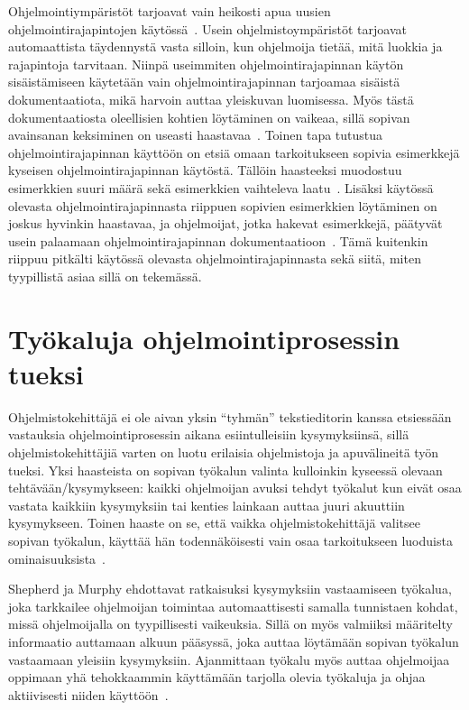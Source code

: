 \documentclass[finnish]{tktltiki2}
\theoremstyle{definition}
\theoremstyle{remark}
\begin{document}
Ohjelmointiympäristöt tarjoavat vain heikosti apua uusien ohjelmointirajapintojen käytössä~\cite{jungloid-mining}. Usein ohjelmistoympäristöt tarjoavat automaattista täydennystä vasta silloin, kun ohjelmoija tietää, mitä luokkia ja rajapintoja tarvitaan. Niinpä useimmiten ohjelmointirajapinnan käytön sisäistämiseen käytetään vain ohjelmointirajapinnan tarjoamaa sisäistä dokumentaatiota, mikä harvoin auttaa yleiskuvan luomisessa. Myös tästä dokumentaatiosta oleellisien kohtien löytäminen on vaikeaa, sillä sopivan avainsanan keksiminen on useasti haastavaa~\cite{what-to-search-for}.
Toinen tapa tutustua ohjelmointirajapinnan käyttöön on etsiä omaan tarkoitukseen sopivia esimerkkejä kyseisen ohjelmointirajapinnan käytöstä. Tällöin haasteeksi muodostuu esimerkkien suuri määrä sekä esimerkkien vaihteleva laatu~\cite{example-overflow-social-media-for-code-recommendations}. Lisäksi käytössä olevasta ohjelmointirajapinnasta riippuen sopivien esimerkkien löytäminen on joskus hyvinkin haastavaa, ja ohjelmoijat, jotka hakevat esimerkkejä, päätyvät usein palaamaan ohjelmointirajapinnan dokumentaatioon~\cite{asking-and-answering-api-questions}. Tämä kuitenkin riippuu pitkälti käytössä olevasta ohjelmointirajapinnasta sekä siitä, miten tyypillistä asiaa sillä on tekemässä.

\section{Työkaluja ohjelmointiprosessin tueksi}
Ohjelmistokehittäjä ei ole aivan yksin ``tyhmän'' tekstieditorin kanssa etsiessään vastauksia ohjelmointiprosessin aikana esiintulleisiin kysymyksiinsä, sillä ohjelmistokehittäjiä varten on luotu erilaisia ohjelmistoja ja apuvälineitä työn tueksi.
Yksi haasteista on sopivan työkalun valinta kulloinkin kyseessä olevaan tehtävään/kysymykseen: kaikki ohjelmoijan avuksi tehdyt työkalut kun eivät osaa vastata kaikkiin kysymyksiin tai kenties lainkaan auttaa juuri akuuttiin kysymykseen. Toinen haaste on se, että vaikka ohjelmistokehittäjä valitsee sopivan työkalun, käyttää hän todennäköisesti vain osaa tarkoitukseen luoduista ominaisuuksista~\cite{whyline}.

Shepherd ja Murphy ehdottavat ratkaisuksi kysymyksiin vastaamiseen työkalua, joka tarkkailee ohjelmoijan toimintaa automaattisesti samalla tunnistaen kohdat, missä ohjelmoijalla on tyypillisesti vaikeuksia. Sillä on myös valmiiksi määritelty informaatio auttamaan alkuun pääsyssä, joka auttaa löytämään sopivan työkalun vastaamaan yleisiin kysymyksiin. Ajanmittaan työkalu myös auttaa ohjelmoijaa oppimaan yhä tehokkaammin käyttämään tarjolla olevia työkaluja ja ohjaa aktiivisesti niiden käyttöön~\cite{programmers-coach}.
\end{document}

